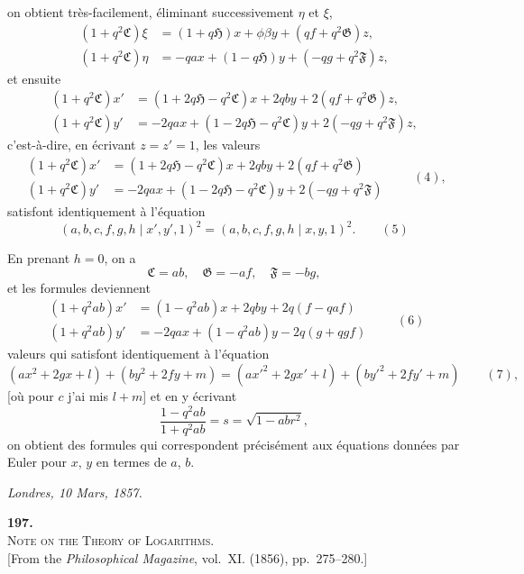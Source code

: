 \documentclass[11pt]{article}
\begin{document}
on obtient tr\`es-facilement, \'eliminant successivement $\eta$ et $\xi$,
\[
\begin{aligned}
(1+q^{2}\mathfrak{C})\xi &= (1+q\mathfrak{H})x + \phi\beta y + (qf + q^{2}\mathfrak{G})z,\\
(1+q^{2}\mathfrak{C})\eta &= -qax + (1-q\mathfrak{H})y + (-q g + q^{2}\mathfrak{F})z,
\end{aligned}
\]
et ensuite
\[
\begin{aligned}
(1+q^{2}\mathfrak{C})x' &= (1+2q\mathfrak{H}-q^{2}\mathfrak{C})x + 2q b y + 2(qf + q^{2}\mathfrak{G})z,\\
(1+q^{2}\mathfrak{C})y' &= -2qax + (1-2q\mathfrak{H}-q^{2}\mathfrak{C})y + 2(-qg+q^{2}\mathfrak{F})z,
\end{aligned}
\]
c'est-\`a-dire, en \'ecrivant $z=z'=1$, les valeurs
\[
\begin{aligned}
(1+q^{2}\mathfrak{C})x' &= (1+2q\mathfrak{H}-q^{2}\mathfrak{C})x + 2q b y + 2(qf + q^{2}\mathfrak{G})\\
(1+q^{2}\mathfrak{C})y' &= -2qax + (1-2q\mathfrak{H}-q^{2}\mathfrak{C})y + 2(-qg+q^{2}\mathfrak{F})
\end{aligned}\qquad(4),
\]
satisfont identiquement \`a l'\'equation
\[
(a,b,c,f,g,h\mid x',y',1)^{2}=(a,b,c,f,g,h\mid x,y,1)^{2}.\qquad(5)
\]

En prenant $h=0$, on a
\[
\mathfrak{C}=ab,\quad \mathfrak{G}=-af,\quad \mathfrak{F}=-bg,
\]
et les formules deviennent
\[
\begin{aligned}
(1+q^{2}ab)x' &= (1-q^{2}ab)x + 2q b y + 2q(f-q af)\\
(1+q^{2}ab)y' &= -2qax + (1-q^{2}ab)y - 2q(g+q gf)
\end{aligned}\qquad(6)
\]
valeurs qui satisfont identiquement \`a l'\'equation
\[
(ax^{2}+2gx+l) + (by^{2}+2fy+m) = (ax'^{2}+2gx'+l) + (by'^{2}+2fy'+m)\qquad(7),
\]
[o\`u pour $c$ j'ai mis $l+m$] et en y \'ecrivant
\[
\frac{1-q^{2}ab}{1+q^{2}ab}=s=\sqrt{1-abr^{2}},
\]
on obtient des formules qui correspondent pr\'ecis\'ement aux \'equations donn\'ees par Euler pour $x$, $y$ en termes de $a$, $b$.

\medskip
\hfill \emph{Londres, 10 Mars, 1857.}

\clearpage


\begin{center}
\textbf{\large 197.}\\[6pt]
\textsc{Note on the Theory of Logarithms.}\\[4pt]
\small [From the \emph{Philosophical Magazine}, vol.\ XI. (1856), pp.\ 275--280.]
\end{center}
\end{document}
